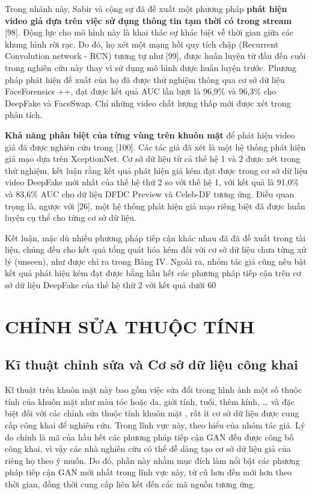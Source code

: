 \documentclass{article}
\begin{document}
Trong nhánh này, Sabir và cộng sự đã đề xuất một phương pháp \textbf{phát hiện video giả dựa trên việc sử dụng thông tin tạm thời có trong stream} [98]. Động lực cho mô hình này là khai thác sự khác biệt về thời gian giữa các khung hình rời rạc. Do đó, họ xét một mạng hồi quy tích chập (Recurrent Convolution network - RCN) tương tự như [99], được huấn luyện từ đầu đến cuối trong nghiên cứu này thay vì sử dụng mô hình được huấn luyện trước. Phương pháp phát hiện đề xuất của họ đã được thử nghiệm thông qua cơ sở dữ liệu FaceForensics ++, đạt được kết quả AUC lần lượt là 96,9\% và 96,3\% cho DeepFake và FaceSwap. Chỉ những video chất lượng thấp mới được xét trong phân tích.

\textbf{Khả năng phân biệt của từng vùng trên khuôn mặt} để phát hiện video giả đã được nghiên cứu trong [100]. Các tác giả đã xét là một hệ thống phát hiện giả mạo dựa trên XceptionNet. Cơ sở dữ liệu từ cả thế hệ 1 và 2 được xét trong thử nghiệm, kết luận rằng kết quả phát hiện giả kém đạt được trong cơ sở dữ liệu video DeepFake mới nhất của thế hệ thứ 2 so với thế hệ 1, với kết quả là 91,0\% và 83,6\% AUC cho dữ liệu DFDC Preview và Celeb-DF tương ứng. Điều quan trọng là, ngược với [26], một hệ thống phát hiện giả mạo riêng biệt đã được huấn luyện cụ thể cho từng cơ sở dữ liệu.

Kết luận, mặc dù nhiều phương pháp tiếp cận khác nhau đã đã đề xuất trong tài liệu, chúng đều cho kết quả tổng quát hóa kém đối với cơ sở dữ liệu chưa từng xử lý (unseen), như được chỉ ra trong Bảng IV. Ngoài ra, nhóm tác giả cũng nêu bật kết quả phát hiện kém đạt được bằng hầu hết các phương pháp tiếp cận trên cơ sở dữ liệu DeepFake của thế hệ thứ 2 với kết quả dưới 60%

\section{CHỈNH SỬA THUỘC TÍNH}

\subsection{Kĩ thuật chỉnh sửa và Cơ sở dữ liệu công khai}

Kĩ thuật trên khuôn mặt này bao gồm việc sửa đổi trong hình ảnh một số thuộc tính của khuôn mặt như màu tóc hoặc da, giới tính, tuổi, thêm kính, … và đặc biệt đối với các chỉnh sửa thuộc tính khuôn mặt , rất ít cơ sở dữ liệu được cung cấp công khai để nghiên cứu. Trong lĩnh vực này, theo hiểu của nhóm tác giả. Lý do chính là mã của hầu hết các phương pháp tiếp cận GAN đều được công bố công khai, vì vậy các nhà nghiên cứu có thể dễ dàng tạo cơ sở dữ liệu giả của riêng họ theo ý muốn. Do đó, phần này nhằm mục đích làm nổi bật các phương pháp tiếp cận GAN mới nhất trong lĩnh vực này, từ cũ hơn đến mới hơn theo thời gian, đồng thời cung cấp liên kết đến các mã nguồn tương ứng.
\end{document}
